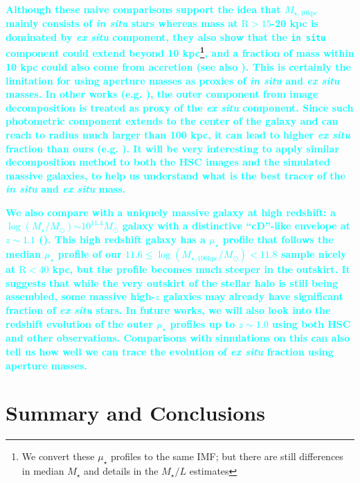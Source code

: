 \documentclass[a4paper,fleqn,usenatbib]{mnras}
\def\mstar{{$M_{\star}$}}
\def\logms{{$\log (M_{\star}/M_{\odot})$}}
\def\minn{{$M_{\star,10\mathrm{kpc}}$}}
\def\logmtot{{$\log (M_{\star,100\mathrm{kpc}}/M_{\odot})$}}
\def\m2l{{$M_{\star}/L$}}
\def\mden{{$\mu_{\star}$}}
\newcommand{\song}[1]{\textcolor{cyan}{\textbf{#1}}}
\begin{document}
    \song{
    Although these naive comparisons support the idea that \minn{} mainly consists 
    of \textit{in situ} stars whereas mass at $\mathrm{R} > 15$-20 kpc is dominated 
    by \textit{ex situ} component, they also show that the \texttt{in situ} component 
    could extend beyond 10 kpc\footnote{We convert these \mden{} profiles to the same 
    \citealt{Chabrier2003} IMF; but there are still differences in median \mstar{} 
    and details in the \m2l{} estimates}, and a fraction of mass within 10 kpc could 
    also come from accretion (see also \citealt{RodriguezGomez2016}). 
    This is certainly the limitation for using aperture masses as proxies of 
    \textit{in situ} and \textit{ex situ} masses. 
    In other works (e.g. \citealt{Huang2013a, Spavone2017}), 
    the outer component from image decomposition is treated as proxy of the 
    \textit{ex situ} component. 
    Since such photometric component extends to the center of the galaxy and can 
    reach to radius much larger than 100 kpc, it can lead to higher \textit{ex situ}
    fraction than ours (e.g. \citealt{Spavone2017}). 
    It will be very interesting to apply similar decomposition method to both the 
    HSC images and the simulated massive galaxies, to help us understand what is the 
    best tracer of the \textit{in situ} and \textit{ex situ} mass.
    }

    \song{
    We also compare with a uniquely massive galaxy at high redshift: 
    a \logms{}${\sim} 10^{11.4} M_{\odot}$ galaxy with a distinctive ``cD''-like 
    envelope at $z{\sim} 1.1$ (\citealt{Liu2013}).  
    This high redshift galaxy has a \mden{} profile that follows the median \mden{} 
    profile of our $11.6\leq$\logmtot{}$<11.8$ sample nicely at $\mathrm{R} < 40$ 
    kpc, but the profile becomes much steeper in the outskirt.
    It suggests that while the very outskirt of the stellar halo is still being 
    assembled, some massive high-$z$ galaxies may already have significant fraction 
    of \textit{ex situ} stars. 
    In future works, we will also look into the redshift evolution of the outer 
    \mden{} profiles up to $z\sim 1.0$ using both HSC and other observations. 
    Comparisons with simulations on this can also tell us how well we can trace
    the evolution of \textit{ex situ} fraction using aperture masses.
    }

\section{Summary and Conclusions}
    \label{sec:summary}
    
\end{document}
